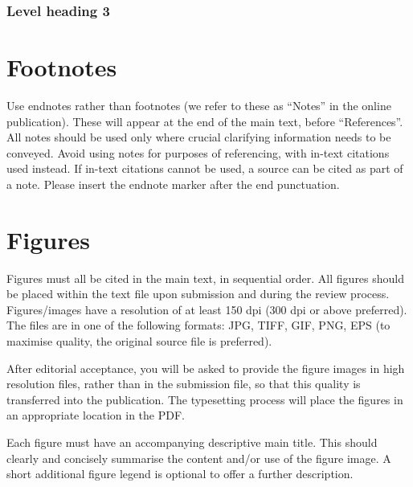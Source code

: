 \documentclass{article}
\begin{document}
\lipsum[66]

\subsubsection{Level heading 3}

\lipsum[75]

\section{Footnotes}\label{sec:footnotes}

Use endnotes rather than footnotes
(we refer to these as ``Notes'' in the online publication).
These will appear at the end of the main text, before ``References''.
All notes should be used only where crucial clarifying information
needs to be conveyed.
Avoid using notes for purposes of referencing, with in-text citations used
instead.
If in-text citations cannot be used, a source can be cited as part of a note.
Please insert the endnote marker after the end punctuation.

\section{Figures}\label{sec:figures}

Figures must all be cited in the main text, in sequential order.
All figures should be placed within the text file upon submission and during
the review process. Figures/images have a resolution of at least 150 dpi
(300 dpi or above preferred). The files are in one of the following formats:
JPG, TIFF, GIF, PNG, EPS (to maximise quality,
the original source file is preferred).

After editorial acceptance, you will be asked to provide the figure
images in high resolution files, rather than in the submission file,
so that this quality is transferred into the publication.
The typesetting process will place the figures in an appropriate
location in the PDF.

Each figure must have an accompanying descriptive main title.
This should clearly and concisely summarise the content and/or
use of the figure image.
A short additional figure legend is optional to offer a further description.
\end{document}

